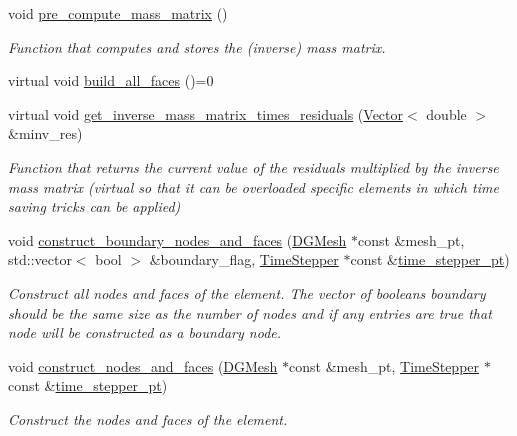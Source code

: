 \begin{DoxyCompactItemize}
void \hyperlink{classoomph_1_1DGElement_a56efa47ff13adce4b7d740290a208ddc}{pre\+\_\+compute\+\_\+mass\+\_\+matrix} ()
\begin{DoxyCompactList}\small\item\em Function that computes and stores the (inverse) mass matrix. \end{DoxyCompactList}\item 
virtual void \hyperlink{classoomph_1_1DGElement_a4387d0837a07a2d5423896331c6c012a}{build\+\_\+all\+\_\+faces} ()=0
\item 
virtual void \hyperlink{classoomph_1_1DGElement_ad2247a9d65eb229dbf30d709c7b28d6d}{get\+\_\+inverse\+\_\+mass\+\_\+matrix\+\_\+times\+\_\+residuals} (\hyperlink{classoomph_1_1Vector}{Vector}$<$ double $>$ \&minv\+\_\+res)
\begin{DoxyCompactList}\small\item\em Function that returns the current value of the residuals multiplied by the inverse mass matrix (virtual so that it can be overloaded specific elements in which time saving tricks can be applied) \end{DoxyCompactList}\item 
void \hyperlink{classoomph_1_1DGElement_aa04768b9b6e6b929c070c6c1c9fc4372}{construct\+\_\+boundary\+\_\+nodes\+\_\+and\+\_\+faces} (\hyperlink{classoomph_1_1DGMesh}{D\+G\+Mesh} $\ast$const \&mesh\+\_\+pt, std\+::vector$<$ bool $>$ \&boundary\+\_\+flag, \hyperlink{classoomph_1_1TimeStepper}{Time\+Stepper} $\ast$const \&\hyperlink{classoomph_1_1GeomObject_a3c92023891dd4a0e818022f467eeb7f1}{time\+\_\+stepper\+\_\+pt})
\begin{DoxyCompactList}\small\item\em Construct all nodes and faces of the element. The vector of booleans boundary should be the same size as the number of nodes and if any entries are true that node will be constructed as a boundary node. \end{DoxyCompactList}\item 
void \hyperlink{classoomph_1_1DGElement_a6f7fc1def2a798ee364ae33c8925245f}{construct\+\_\+nodes\+\_\+and\+\_\+faces} (\hyperlink{classoomph_1_1DGMesh}{D\+G\+Mesh} $\ast$const \&mesh\+\_\+pt, \hyperlink{classoomph_1_1TimeStepper}{Time\+Stepper} $\ast$const \&\hyperlink{classoomph_1_1GeomObject_a3c92023891dd4a0e818022f467eeb7f1}{time\+\_\+stepper\+\_\+pt})
\begin{DoxyCompactList}\small\item\em Construct the nodes and faces of the element. \end{DoxyCompactList}\item 

\end{DoxyCompactItemize}
